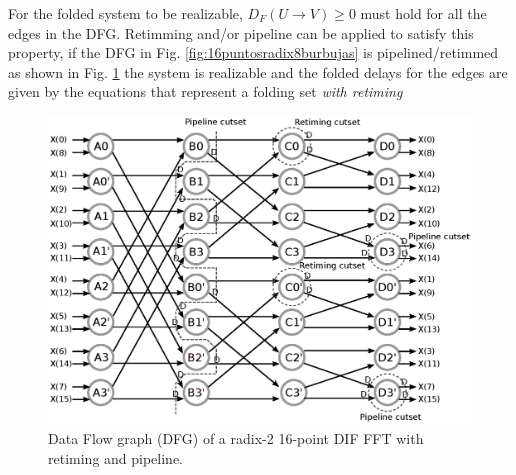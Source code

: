 \documentclass[journal,comsoc]{IEEEtran}
\begin{document}
For the folded system to be realizable, $D_F(U\to V)\geq0$ must hold for all the edges in the DFG. Retimming and/or pipeline can be applied to satisfy this property, if the DFG in Fig. \ref{fig:16puntosradix8burbujas} is pipelined/retimmed as shown in Fig. \ref{fig:dfg_16_ret} the system is realizable and the folded delays for the edges are given by the equations that represent a folding set \textit{with retiming}
\begin{figure}[h!]
\centering
 \includegraphics[width=\linewidth]{Diagramas/Butter16_pipe.eps}%
\caption{Data Flow graph (DFG) of a radix-2 16-point DIF FFT with retiming and pipeline.}
\label{fig:dfg_16_ret}
\end{figure}
\end{document}
